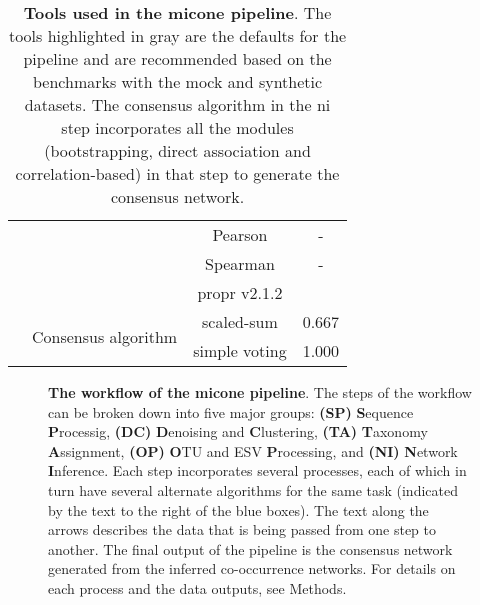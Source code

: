 \begin{table}[H]
\begin{tabular}{|c|c|c|c|}
                                          & & Pearson & - \\
                                          & & Spearman & - \\
                                          & & propr v2.1.2 & \cite{quinnProprRpackageIdentifying2017} \\ \cline{2-4}
                                          & \multirow{2}{*}{Consensus algorithm} & \rowcolor{lightgray} scaled-sum & 0.667 \\
                                          & & simple voting & 1.000 \\
      \hline
    \end{tabular}
    \caption{
      \textbf{Tools used in the \ac{micone} pipeline}.
      The tools highlighted in gray are the defaults for the pipeline and are recommended based on the benchmarks with the mock and synthetic datasets.
      The consensus algorithm in the \ac{ni} step incorporates all the modules (bootstrapping, direct association and correlation-based) in that step to generate the consensus network.
    }
    \label{tab:micone_tools}
  \end{table}


  \FloatBarrier
  \newpage

  \FloatBarrier
  \newpage
  \begin{figure}[H]
    \centering
    \caption{
      \textbf{The workflow of the \ac{micone} pipeline}.
      The steps of the workflow can be broken down into five major groups: \textbf{(SP)} \textbf{S}equence \textbf{P}rocessig, \textbf{(DC)} \textbf{D}enoising and \textbf{C}lustering, \textbf{(TA)} \textbf{T}axonomy \textbf{A}ssignment, \textbf{(OP)} \textbf{O}TU and ESV \textbf{P}rocessing, and \textbf{(NI)} \textbf{N}etwork \textbf{I}nference.
      Each step incorporates several processes, each of which in turn have several alternate algorithms for the same task (indicated by the text to the right of the blue boxes).
      The text along the arrows describes the data that is being passed from one step to another.
      The final output of the pipeline is the consensus network generated from the inferred co-occurrence networks.
      For details on each process and the data outputs, see Methods.
    }
    \label{fig:figure1}
  \end{figure}



